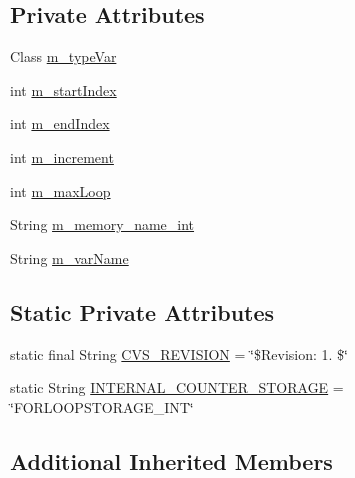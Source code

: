 \subsection*{Private Attributes}
\begin{DoxyCompactItemize}
\item 
Class \hyperlink{classorg_1_1jgap_1_1gp_1_1function_1_1_for_loop_abd567d94ca074f3447ad8cc633f12b1b}{m\-\_\-type\-Var}
\item 
int \hyperlink{classorg_1_1jgap_1_1gp_1_1function_1_1_for_loop_a47a1fb231f018111e2822d9cec1c5806}{m\-\_\-start\-Index}
\item 
int \hyperlink{classorg_1_1jgap_1_1gp_1_1function_1_1_for_loop_a98e5b9530bafac228481070e5594e8d0}{m\-\_\-end\-Index}
\item 
int \hyperlink{classorg_1_1jgap_1_1gp_1_1function_1_1_for_loop_abcc098837005bbe8a7d74720aac274f4}{m\-\_\-increment}
\item 
int \hyperlink{classorg_1_1jgap_1_1gp_1_1function_1_1_for_loop_afc96a0e9817af4047e8d0a6f8484ccb4}{m\-\_\-max\-Loop}
\item 
String \hyperlink{classorg_1_1jgap_1_1gp_1_1function_1_1_for_loop_ab1eef316261cb5965f9e0a3c56e4b4a2}{m\-\_\-memory\-\_\-name\-\_\-int}
\item 
String \hyperlink{classorg_1_1jgap_1_1gp_1_1function_1_1_for_loop_aa2dea4a97e8bf2eac31539568dfbebfe}{m\-\_\-var\-Name}
\end{DoxyCompactItemize}
\subsection*{Static Private Attributes}
\begin{DoxyCompactItemize}
\item 
static final String \hyperlink{classorg_1_1jgap_1_1gp_1_1function_1_1_for_loop_af4ebe5ca571a184c6bd5b7b4b452ee22}{C\-V\-S\-\_\-\-R\-E\-V\-I\-S\-I\-O\-N} = \char`\"{}\$Revision\-: 1. \$\char`\"{}
\item 
static String \hyperlink{classorg_1_1jgap_1_1gp_1_1function_1_1_for_loop_a8a1e154d26ba0413277f2c85ccc858ed}{I\-N\-T\-E\-R\-N\-A\-L\-\_\-\-C\-O\-U\-N\-T\-E\-R\-\_\-\-S\-T\-O\-R\-A\-G\-E} = \char`\"{}F\-O\-R\-L\-O\-O\-P\-S\-T\-O\-R\-A\-G\-E\-\_\-\-I\-N\-T\char`\"{}
\end{DoxyCompactItemize}
\subsection*{Additional Inherited Members}


